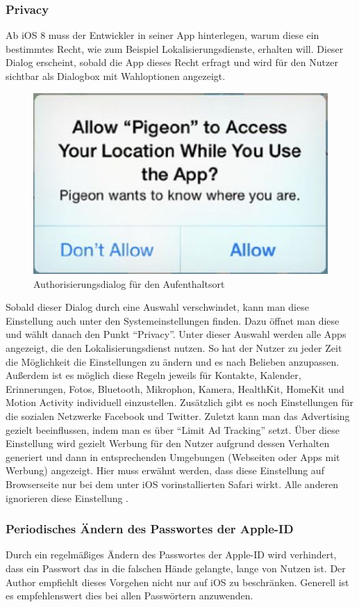 		\subsubsection{Privacy}
			Ab iOS 8 muss der Entwickler in seiner App hinterlegen, warum diese ein
			bestimmtes Recht, wie zum Beispiel Lokalisierungsdienste, erhalten will.
			Dieser Dialog erscheint, sobald die App dieses Recht erfragt und wird für den
			Nutzer sichtbar als Dialogbox mit Wahloptionen angezeigt.
			\begin{figure}[h]
				\centering
				\includegraphics[width=0.4\linewidth]{ios/media/privacy-dialog.jpg}
				\caption{Authorisierungsdialog für den Aufenthaltsort 
				\cite[S.535]{LearnIOS7Dev2013}}
				\label{fig:privacy-dialog}
			\end{figure}
			Sobald dieser Dialog durch eine Auswahl verschwindet, kann man diese
			Einstellung auch unter den Systemeinstellungen finden. Dazu öffnet man diese
			und wählt danach den Punkt "`Privacy"'. Unter dieser Auswahl werden alle Apps
			angezeigt, die den Lokalisierungsdienst nutzen. So hat der Nutzer zu jeder
			Zeit die Möglichkeit die Einstellungen zu ändern und es nach Belieben
			anzupassen. Außerdem ist es möglich diese Regeln jeweils für
			Kontakte, Kalender, Erinnerungen, Fotos, Bluetooth, Mikrophon, Kamera,
			HealthKit, HomeKit und Motion Activity individuell einzustellen. Zusätzlich
			gibt es noch Einstellungen für die sozialen Netzwerke Facebook und Twitter.
			Zuletzt kann man das Advertising gezielt beeinflussen, indem man es über
			"`Limit Ad Tracking"' setzt. Über diese Einstellung wird gezielt Werbung für
			den Nutzer aufgrund dessen Verhalten generiert und dann in entsprechenden
			Umgebungen (Webseiten oder Apps mit Werbung) angezeigt. Hier muss erwähnt
			werden, dass diese Einstellung auf Browserseite nur bei dem unter iOS
			vorinstallierten Safari wirkt. Alle anderen ignorieren diese Einstellung 
			\cite{AppleMngPrivacy2015}\cite[S.131]{IKungFu2014}.
		\subsubsection{Periodisches Ändern des Passwortes der Apple-ID}
			Durch ein regelmäßiges Ändern des Passwortes der Apple-ID wird verhindert,
			dass ein Passwort das in die falschen Hände gelangte, lange von Nutzen ist.
			Der Author empfiehlt dieses Vorgehen nicht nur auf iOS zu beschränken.
			Generell ist es empfehlenswert dies bei allen Passwörtern anzuwenden.

